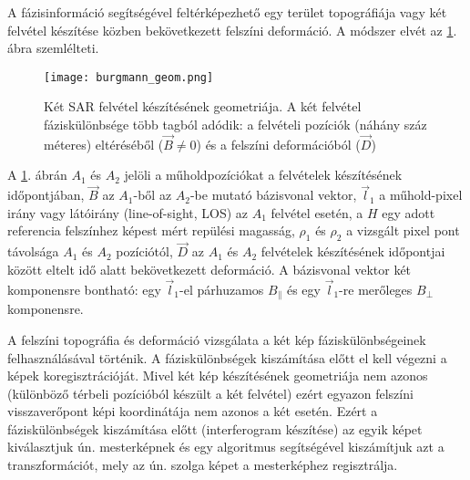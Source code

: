 \documentclass[12pt]{report}
\numberwithin{equation}{section}
\numberwithin{table}{section}
\numberwithin{figure}{section}
\begin{document}
A fázisinformáció segítségével feltérképezhető egy terület topográfiája vagy két felvétel készítése közben bekövetkezett felszíni deformáció. A módszer elvét az \ref{burgmann:geom}. ábra szemlélteti.

\begin{figure}[H]
    \centering
    \texttt{[image: burgmann\_geom.png]}
   \caption{Két SAR felvétel készítésének geometriája. A két felvétel fáziskülönbsége több tagból adódik: a felvételi pozíciók (náhány száz méteres) eltéréséből ($\vec{B} \ne 0$) és a felszíni deformációból ($\vec{D}$) \cite{BurgmannInSAR}}\label{burgmann:geom}
\end{figure}

A \ref{burgmann:geom}. ábrán $A_1$ és $A_2$ jelöli a műholdpozíciókat a felvételek készítésének időpontjában, $\vec{B}$ az $A_1$-ből az $A_2$-be mutató bázisvonal vektor, $\vec{l}_1$ a műhold-pixel irány vagy látóirány (line-of-sight, LOS) az $A_1$ felvétel esetén, a $H$ egy adott referencia felszínhez képest mért repülési magasság, $\rho_1$ és $\rho_2$ a vizsgált pixel pont távolsága $A_1$ és $A_2$ pozíciótól, $\vec{D}$ az $A_1$ és $A_2$ felvételek készítésének időpontjai között eltelt idő alatt bekövetkezett deformáció. A bázisvonal vektor két komponensre bontható: egy $\vec{l}_1$-el párhuzamos $B_{\parallel}$ és egy $\vec{l}_1$-re merőleges $B_{\perp}$ komponensre.

A felszíni topográfia és deformáció vizsgálata a két kép fáziskülönbségeinek felhasználásával történik. A fáziskülönbségek kiszámítása előtt el kell végezni a képek koregisztrációját. Mivel két kép készítésének geometriája nem azonos (különböző térbeli pozícióból készült a két felvétel) ezért egyazon felszíni visszaverőpont képi koordinátája nem azonos a két esetén. Ezért a fáziskülönbségek kiszámítása előtt (interferogram készítése) az egyik képet kiválasztjuk ún. mesterképnek és egy algoritmus segítségével kiszámítjuk azt a transzformációt, mely az ún. szolga képet a mesterképhez regisztrálja.
\end{document}
